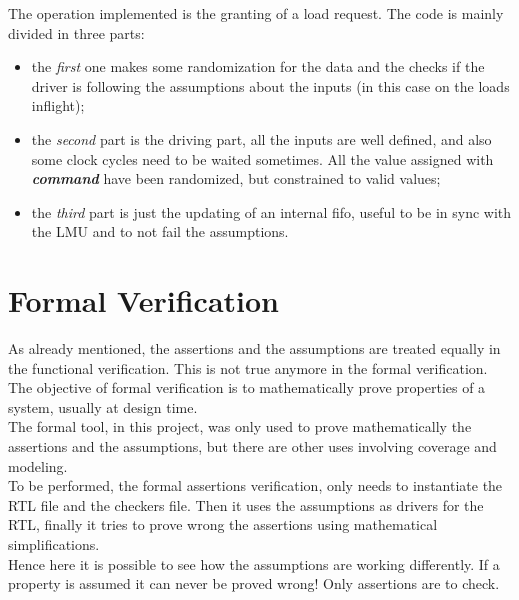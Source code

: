 The operation implemented is the granting of a load request. The code is mainly divided in three parts: 
\begin{itemize}
    \item the \emph{first} one makes some randomization for the data and the checks if the driver is following the assumptions about the inputs (in this case on the loads inflight);
    
    \item the \emph{second} part is the driving part, all the inputs are well defined, and also some clock cycles need to be waited sometimes. All the value assigned with \textbf{\emph{command}} have been randomized, but constrained to valid values;
    
    \item the \emph{third} part is just the updating of an internal fifo, useful to be in sync with the LMU and to not fail the assumptions.
\end{itemize}  
\bigskip






\section{Formal Verification}
As already mentioned, the assertions and the assumptions are treated equally in the functional verification. This is not true anymore in the formal verification.\\

The objective of formal veriﬁcation is to mathematically prove properties of a system, usually at design time\cite{verification-book-2018-formal}.\\
The formal tool, in this project, was only used to prove mathematically the assertions and the assumptions, but there are other uses involving coverage and modeling.\\

To be performed, the formal assertions verification, only needs to instantiate the RTL file and the checkers file. Then it uses the assumptions as drivers for the RTL, finally it tries to prove wrong the assertions using mathematical simplifications.\\

Hence here it is possible to see how the assumptions are working differently. If a property is assumed it can never be proved wrong! Only assertions are to check.\\

